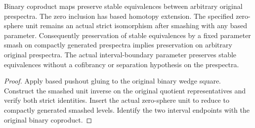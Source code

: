 \begin{proposition}
  \label{prop:actual-general-binary-coproduct-and-smash-unit}
  \leanok
  Binary coproduct maps preserve stable equivalences between arbitrary original prespectra. The zero inclusion has based homotopy extension. The specified zero-sphere unit remains an actual strict isomorphism after smashing with any based parameter. Consequently preservation of stable equivalences by a fixed parameter smash on compactly generated prespectra implies preservation on arbitrary original prespectra. The actual interval-boundary parameter preserves stable equivalences without a cofibrancy or separation hypothesis on the prespectra.
\end{proposition}
\begin{proof}
  Apply based pushout gluing to the original binary wedge square. Construct the smashed unit inverse on the original quotient representatives and verify both strict identities. Insert the actual zero-sphere unit to reduce to compactly generated smashed levels. Identify the two interval endpoints with the original binary coproduct.
  \leanok
\end{proof}

